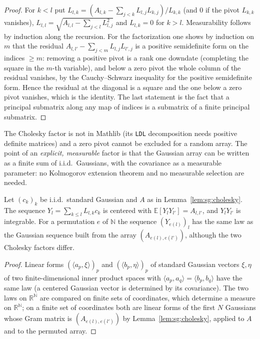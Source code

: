 \begin{proof}
  \leanok
For $k<l$ put $L_{l,k}=(A_{l,k}-\sum_{j<k}L_{l,j}L_{k,j})/L_{k,k}$ (and $0$ if the pivot $L_{k,k}$ vanishes), $L_{l,l}=\sqrt{A_{l,l}-\sum_{j<l}L_{l,j}^2}$ and $L_{l,k}=0$ for $k>l$. Measurability follows by induction along the recursion. For the factorization one shows by induction on $m$ that the residual $A_{l,l'}-\sum_{j<m}L_{l,j}L_{l',j}$ is a positive semidefinite form on the indices $\ge m$: removing a positive pivot is a rank one downdate (completing the square in the $m$-th variable), and below a zero pivot the whole column of the residual vanishes, by the Cauchy--Schwarz inequality for the positive semidefinite form.
Hence the residual at the diagonal is a square and the one below a zero pivot vanishes, which is the identity. The last statement is the fact that a principal submatrix along any map of indices is a submatrix of a finite principal submatrix.
\end{proof}

The Cholesky factor is not in Mathlib (its \texttt{LDL} decomposition needs positive definite matrices) and a zero pivot cannot be excluded for a random array. The point of an \emph{explicit, measurable} factor is that the Gaussian array can be written as a finite sum of i.i.d.\ Gaussians, with the covariance as a measurable parameter: no Kolmogorov extension theorem and no measurable selection are needed.

\begin{lemma}\label{lem:sg:gaussian-gram}
  \leanok
Let $(c_k)_k$ be i.i.d.\ standard Gaussian and $A$ as in Lemma~\ref{lem:sg:cholesky}. The sequence $Y_l=\sum_{k\le l}L_{l,k}c_k$ is centered with $\mathbb E[Y_lY_{l'}]=A_{l,l'}$, and $Y_lY_{l'}$ is integrable. For a permutation $e$ of $\mathbb N$ the sequence $(Y_{e(l)})_l$ has the same law as the Gaussian sequence built from the array $(A_{e(l),e(l')})$, although the two Cholesky factors differ.
\end{lemma}

\begin{proof}
  \leanok
{}
Linear forms $(\langle a_p,\xi\rangle)_p$ and $(\langle b_p,\eta\rangle)_p$ of standard Gaussian vectors $\xi,\eta$ of two
finite-dimensional inner product spaces with $\langle a_p,a_q\rangle=\langle b_p,b_q\rangle$ have the same law (a centered Gaussian vector is determined by its covariance). The two laws on $\mathbb R^{\mathbb N}$ are compared on finite sets of coordinates, which determine a measure on $\mathbb R^{\mathbb N}$; on a finite set of coordinates both are linear forms of the first $N$ Gaussians whose Gram matrix is $(A_{e(l),e(l')})$ by Lemma~\ref{lem:sg:cholesky}, applied to $A$ and to the permuted array.
\end{proof}


